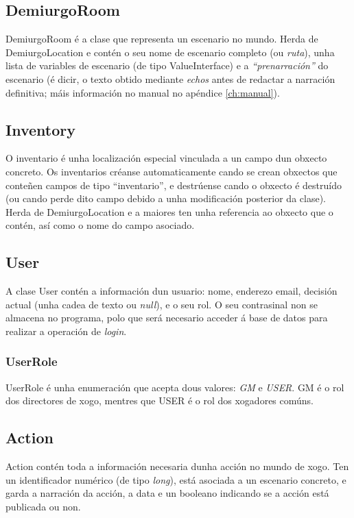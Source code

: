 \subsection{DemiurgoRoom}
DemiurgoRoom é a clase que representa un escenario no mundo. Herda de
DemiurgoLocation e contén o seu nome de escenario completo (ou \textit{ruta}),
unha lista de variables de escenario (de tipo ValueInterface) e a
\textit{``prenarración''} do escenario (é dicir, o texto obtido mediante
\textit{echos} antes de redactar a narración definitiva; máis información no
manual no apéndice \ref{ch:manual}).

\subsection{Inventory}
O inventario é unha localización especial vinculada a un campo dun obxecto
concreto. Os inventarios créanse automaticamente cando se crean obxectos que
conteñen campos de tipo ``inventario'', e destrúense cando o obxecto é
destruído (ou cando perde dito campo debido a unha modificación posterior da
clase). Herda de DemiurgoLocation e a maiores ten unha referencia ao obxecto que
o contén, así como o nome do campo asociado.

\subsection{User}
\label{subsec:user}
A clase User contén a información dun usuario: nome, enderezo email, decisión
actual (unha cadea de texto ou \textit{null}), e o seu rol. O seu contrasinal
non se almacena no programa, polo que será necesario acceder á base de datos
para realizar a operación de \textit{login}.

\subsubsection{UserRole}
UserRole é unha enumeración que acepta dous valores: \textit{GM} e
\textit{USER}. GM é o rol dos directores de xogo, mentres que USER é o rol dos
xogadores comúns.

\subsection{Action}
Action contén toda a información necesaria dunha acción no mundo de xogo.
Ten un identificador numérico (de tipo \textit{long}), está asociada a un
escenario concreto, e garda a narración da acción, a data e un booleano
indicando se a acción está publicada ou non.

